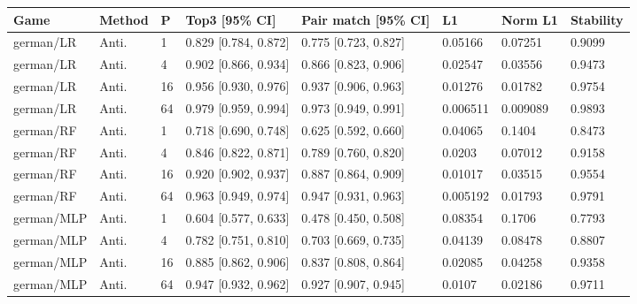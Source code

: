 \endgroup


\begingroup\footnotesize\setlength{\tabcolsep}{3pt}
\begin{tabular}{llllllll}
\toprule
Game & Method & P & Top3 [95\% CI] & Pair match [95\% CI] & L1 & Norm L1 & Stability \\
\midrule
german/LR & Anti. & 1 & 0.829 [0.784, 0.872] & 0.775 [0.723, 0.827] & 0.05166 & 0.07251 & 0.9099 \\
german/LR & Anti. & 4 & 0.902 [0.866, 0.934] & 0.866 [0.823, 0.906] & 0.02547 & 0.03556 & 0.9473 \\
german/LR & Anti. & 16 & 0.956 [0.930, 0.976] & 0.937 [0.906, 0.963] & 0.01276 & 0.01782 & 0.9754 \\
german/LR & Anti. & 64 & 0.979 [0.959, 0.994] & 0.973 [0.949, 0.991] & 0.006511 & 0.009089 & 0.9893 \\
german/RF & Anti. & 1 & 0.718 [0.690, 0.748] & 0.625 [0.592, 0.660] & 0.04065 & 0.1404 & 0.8473 \\
german/RF & Anti. & 4 & 0.846 [0.822, 0.871] & 0.789 [0.760, 0.820] & 0.0203 & 0.07012 & 0.9158 \\
german/RF & Anti. & 16 & 0.920 [0.902, 0.937] & 0.887 [0.864, 0.909] & 0.01017 & 0.03515 & 0.9554 \\
german/RF & Anti. & 64 & 0.963 [0.949, 0.974] & 0.947 [0.931, 0.963] & 0.005192 & 0.01793 & 0.9791 \\
german/MLP & Anti. & 1 & 0.604 [0.577, 0.633] & 0.478 [0.450, 0.508] & 0.08354 & 0.1706 & 0.7793 \\
german/MLP & Anti. & 4 & 0.782 [0.751, 0.810] & 0.703 [0.669, 0.735] & 0.04139 & 0.08478 & 0.8807 \\
german/MLP & Anti. & 16 & 0.885 [0.862, 0.906] & 0.837 [0.808, 0.864] & 0.02085 & 0.04258 & 0.9358 \\
german/MLP & Anti. & 64 & 0.947 [0.932, 0.962] & 0.927 [0.907, 0.945] & 0.0107 & 0.02186 & 0.9711 \\
\bottomrule
\end{tabular}

\endgroup
